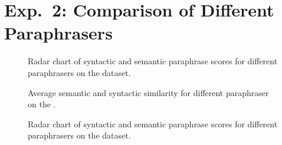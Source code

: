 \section{Exp.\ 2: Comparison of Different Paraphrasers}
\label{sec:app_paraphrases}

\begin{figure}[H]
    \centering
    
    \caption[Paraphrase evaluation radar chart on the \dataBlog{} dataset.]{Radar chart of syntactic and semantic paraphrase scores for different paraphrasers on the \dataBlog{} dataset.}
    \label{fig:radar_blog}
\end{figure}


\begin{figure}[H]
    \centering
    
    \caption[Comparison of paraphrasers on the \dataGutenberg{} dataset.]{Average semantic and syntactic similarity for different paraphraser on the \dataGutenberg{}.}
    \label{fig:sem_syn_gutenberg}
\end{figure}

\begin{figure}[H]
    \centering
    
    \caption[Paraphrase evaluation radar chart on the \dataGutenberg{} dataset.]{Radar chart of syntactic and semantic paraphrase scores for different paraphrasers on the \dataGutenberg{} dataset.}
    \label{fig:radar_gutenberg}
\end{figure}
